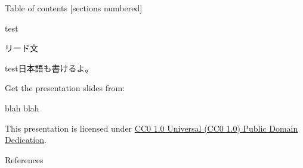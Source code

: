 \begin{frame}{Table of contents}
  [sections numbered]
  \tableofcontents[hideallsubsections]
\end{frame}

\begin{frame}{test}
  \begin{lead}
    リード文
  \end{lead}
  test\cite{knuth}日本語も書けるよ。
\end{frame}

\begin{frame}[c]

  Get the presentation slides from:

  \begin{center}blah blah\end{center}

  This presentation is licensed under
    \href{https://creativecommons.org/publicdomain/zero/1.0/}{
    CC0 1.0 Universal (CC0 1.0) Public Domain Dedication}.

  \begin{center}\cczero\end{center}

\end{frame}

\begin{frame}[allowframebreaks]{References}
  \printbibliography[heading=none]
\end{frame}



